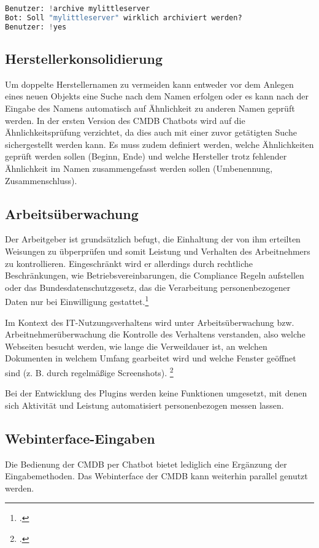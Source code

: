 \begin{lstlisting}[language=python, label=delconfirm, caption=Nachfrage bei der Archivierung von Objekten]
Benutzer: !archive mylittleserver
Bot: Soll "mylittleserver" wirklich archiviert werden?
Benutzer: !yes
\end{lstlisting}

\subsection{Herstellerkonsolidierung}
Um doppelte Herstellernamen zu vermeiden kann entweder vor dem Anlegen eines neuen Objekts eine Suche nach dem Namen erfolgen oder es kann nach der Eingabe des Namens automatisch auf Ähnlichkeit zu anderen Namen geprüft werden.
In der ersten Version des \acs{CMDB} Chatbots wird auf die Ähnlichkeitsprüfung verzichtet, da dies auch mit einer zuvor getätigten Suche sichergestellt werden kann. Es muss zudem definiert werden, welche Ähnlichkeiten geprüft werden sollen (Beginn, Ende) und welche Hersteller trotz fehlender Ähnlichkeit im Namen zusammengefasst werden sollen (Umbenennung, Zusammenschluss).

\subsection{Arbeitsüberwachung}
Der Arbeitgeber ist grundsätzlich befugt, die Einhaltung der von ihm erteilten Weisungen zu übperprüfen und somit Leistung und Verhalten des Arbeitnehmers zu kontrollieren. Eingeschränkt wird er allerdings durch rechtliche Beschränkungen, wie Betriebsvereinbarungen, die Compliance Regeln aufstellen oder das Bundesdatenschutzgesetz, das die Verarbeitung personenbezogener Daten nur bei Einwilligung gestattet.\footcite[Vgl.][1\psqq]{Rudkowski_2015_Arbeitnehmer}

Im Kontext des IT-Nutzungsverhaltens wird unter Arbeitsüberwachung bzw. Arbeitnehmerüberwachung die Kontrolle des Verhaltens verstanden, also welche Webseiten besucht werden, wie lange die Verweildauer ist, an welchen Dokumenten in welchem Umfang gearbeitet wird und welche Fenster geöffnet sind (z. B. durch regelmäßige Screenshots).
\footcite[Vgl.][55]{Rudkowski_2015_Arbeitnehmer}

Bei der Entwicklung des Plugins werden keine Funktionen umgesetzt, mit denen sich Aktivität und Leistung automatisiert personenbezogen messen lassen. 

\subsection{Webinterface-Eingaben}
Die Bedienung der \acs{CMDB} per Chatbot bietet lediglich eine Ergänzung der Eingabemethoden. Das Webinterface der \acs{CMDB} kann weiterhin parallel genutzt werden.

